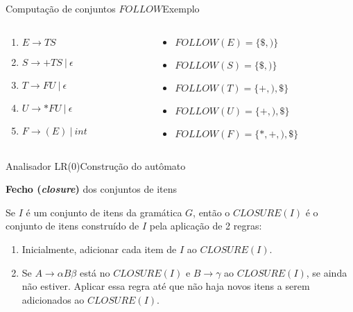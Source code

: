 \begin{frame}{Computação de conjuntos $FOLLOW$}{Exemplo}
    \begin{columns}
        \begin{column}{0.3\textwidth}
            \begin{enumerate}
              \item $E \rightarrow T S$

              \item $S \rightarrow + T S\ |\ \epsilon$

              \item $T \rightarrow F U\ |\ \epsilon$

              \item $U \rightarrow * F U\ |\ \epsilon$

              \item $F \rightarrow ( E )\ |\ int$
            \end{enumerate}
        \end{column}    
        \pause
        \begin{column}{0.7\textwidth}
            \begin{itemize}
                \item $FOLLOW(E) = \{\$, )\}$
                \item $FOLLOW(S) = \{\$, )\}$
		\item $FOLLOW(T) = \{+, ), \$ \}$
		\item $FOLLOW(U) = \{+, ), \$ \}$
                \item $FOLLOW(F) = \{*, +, ), \$\}$
            \end{itemize}
        \end{column}    
    \end{columns}
\end{frame}

\begin{frame}{Analisador LR(0)}{Construção do autômato}


 {\bf Fecho ({\it closure\/})} dos conjuntos de itens\\\bigskip

Se $I$ é um conjunto de itens da gramática $G$, então o
$CLOSURE(I)$ é o conjunto de itens construído de $I$
pela aplicação de 2 regras:

	\begin{enumerate}
		\item Inicialmente, adicionar cada item de $I$ ao $CLOSURE(I)$.
		\item Se $A\rightarrow \alpha B\beta$ está no $CLOSURE(I)$ e
		$B\rightarrow \gamma$ ao $CLOSURE(I)$, se ainda não estiver.
		Aplicar essa regra até que não haja novos itens a serem
		adicionados ao $CLOSURE(I)$.
	\end{enumerate}

\end{frame}

